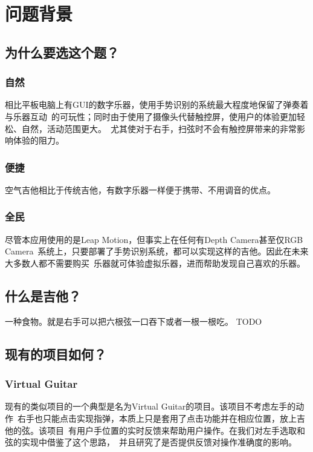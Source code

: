 \chapter{问题背景}

    \section{为什么要选这个题？}

        \subsection{自然}
        相比平板电脑上有GUI的数字乐器，使用手势识别的系统最大程度地保留了弹奏着与乐器互动\
        的可玩性；同时由于使用了摄像头代替触控屏，使用户的体验更加轻松、自然，活动范围更大。\
        尤其使对于右手，扫弦时不会有触控屏带来的非常影响体验的阻力。

        \subsection{便捷}
        空气吉他相比于传统吉他，有数字乐器一样便于携带、不用调音的优点。

        \subsection{全民}
        尽管本应用使用的是Leap Motion，但事实上在任何有Depth Camera甚至仅RGB Camera\
        系统上，只要部署了手势识别系统，都可以实现这样的吉他。因此在未来大多数人都不需要购买\
        乐器就可体验虚拟乐器，进而帮助发现自己喜欢的乐器。


    \section{什么是吉他？}
    一种食物。就是右手可以把六根弦一口吞下或者一根一根吃。 TODO

    \section{现有的项目如何？}

        \subsection{Virtual Guitar}
        现有的类似项目的一个典型是名为Virtual Guitar的项目。该项目不考虑左手的动作\
        右手也只能点击实现指弹，本质上只是套用了点击功能并在相应位置，放上吉他的弦。该项目\
        有用户手位置的实时反馈来帮助用户操作。在我们对左手选取和弦的实现中借鉴了这个思路，\
        并且研究了是否提供反馈对操作准确度的影响。
